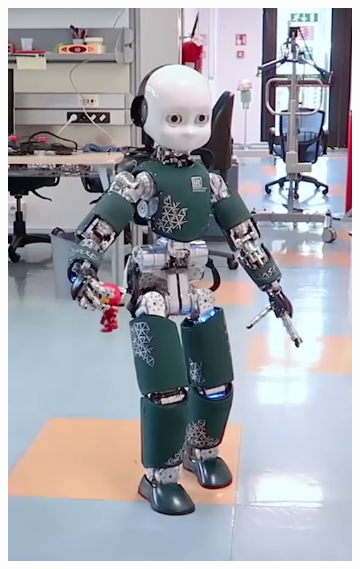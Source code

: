 
\begin{figure}[t]
        \begin{subfigure}[b]{0.32\textwidth}
        \centering
        \includegraphics[width=\columnwidth]{chapter_simplified_benchmarking/figures/step1.png}
    \end{subfigure}
    \hfill
           \begin{subfigure}[b]{0.32\textwidth}
        \centering

\end{subfigure}
\end{figure}
